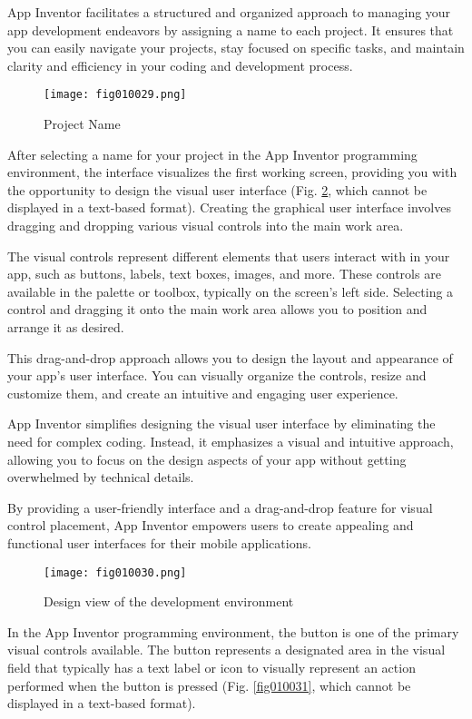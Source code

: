 App Inventor facilitates a structured and organized approach to managing your app development endeavors by assigning a name to each project. It ensures that you can easily navigate your projects, stay focused on specific tasks, and maintain clarity and efficiency in your coding and development process.

\begin{figure}[H]
   \centering
   \texttt{[image: fig010029.png]}
   \caption{Project Name}
\label{fig010029}
\end{figure}

After selecting a name for your project in the App Inventor programming environment, the interface visualizes the first working screen, providing you with the opportunity to design the visual user interface (Fig. \ref{fig010030}, which cannot be displayed in a text-based format). Creating the graphical user interface involves dragging and dropping various visual controls into the main work area.

The visual controls represent different elements that users interact with in your app, such as buttons, labels, text boxes, images, and more. These controls are available in the palette or toolbox, typically on the screen's left side. Selecting a control and dragging it onto the main work area allows you to position and arrange it as desired.

This drag-and-drop approach allows you to design the layout and appearance of your app's user interface. You can visually organize the controls, resize and customize them, and create an intuitive and engaging user experience.

App Inventor simplifies designing the visual user interface by eliminating the need for complex coding. Instead, it emphasizes a visual and intuitive approach, allowing you to focus on the design aspects of your app without getting overwhelmed by technical details.

By providing a user-friendly interface and a drag-and-drop feature for visual control placement, App Inventor empowers users to create appealing and functional user interfaces for their mobile applications.

\begin{figure}[H]
   \centering
   \texttt{[image: fig010030.png]}
   \caption{Design view of the development environment}
\label{fig010030}
\end{figure}

In the App Inventor programming environment, the button is one of the primary visual controls available. The button represents a designated area in the visual field that typically has a text label or icon to visually represent an action performed when the button is pressed (Fig. \ref{fig010031}, which cannot be displayed in a text-based format).

